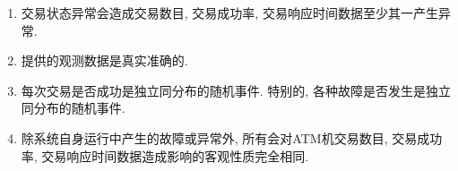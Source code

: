 \begin{enumerate}
    \item 交易状态异常会造成交易数目, 交易成功率, 交易响应时间数据至少其一产生异常.
    \item 提供的观测数据是真实准确的.
    \item 每次交易是否成功是独立同分布的随机事件. 特别的, 各种故障是否发生是独立同分布的随机事件.
    \item 除系统自身运行中产生的故障或异常外, 所有会对ATM机交易数目, 交易成功率, 交易响应时间数据造成影响的客观性质完全相同.
\end{enumerate}
